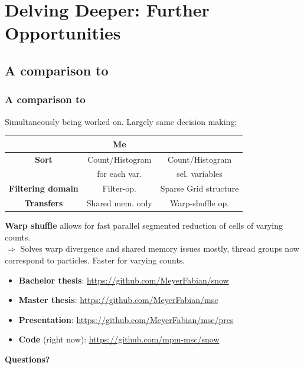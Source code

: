 \documentclass{beamer}
\let\oldcite=\cite
\renewcommand{\cite}[1]{\textcolor[rgb]{.55,.55,.89}{\oldcite{#1}}}
\begin{document}
\section{Delving Deeper: Further Opportunities}
\subsection{A comparison to \cite{Gao:2018}}
\begin{frame}
  \frametitle{A comparison to \cite{Gao:2018}}

Simultaneously being worked on. Largely same decision making:\\
\begin{table}
\begin{tabular}{|c|c|c|}
    \hline
	   & \textbf{Me}              & \textbf{\cite{Gao:2018}} \\\hline
  \textbf{Sort}   & Count/Histogram & Count/Histogram \\
	   & for each var.   & sel. variables  \\\hline
  \textbf{Filtering domain}& Filter-op.& Sparse Grid structure \\\hline
  \textbf{Transfers}        & Shared mem. only & Warp-shuffle op.\\\hline
  \end{tabular}
\end{table}
\textbf{Warp shuffle} allows for fast parallel segmented reduction of cells of varying counts.\\
$\Rightarrow$ Solves warp divergence and shared memory issues mostly, thread groups now correspond to particles. Faster for varying counts.
\end{frame}
\begin{frame}
  \vfill
\begin{itemize}
  \item \textbf{Bachelor thesis}: \url{https://github.com/MeyerFabian/snow}
  \item \textbf{Master thesis}: \url{https://github.com/MeyerFabian/msc}
  \item \textbf{Presentation}: \url{https://github.com/MeyerFabian/msc/pres}
      \item \textbf{Code} (right now): \url{https://github.com/mpm-msc/snow}
\end{itemize}
\vfill
\centering
\textbf{Questions?}
\end{frame}

\printbibliography
\end{document}
